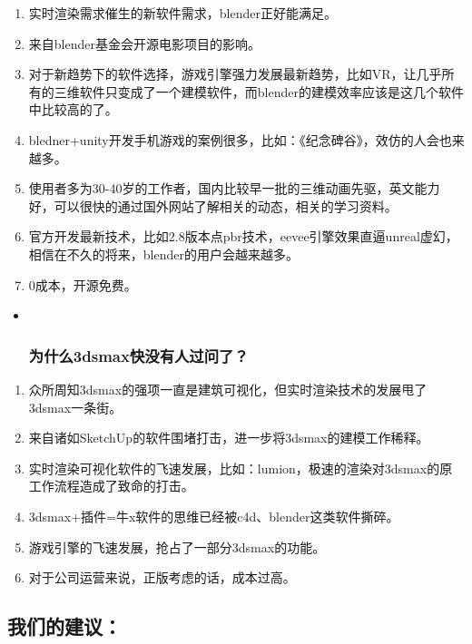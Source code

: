 \documentclass[]{article}
\begin{document}
\begin{enumerate}
\def\labelenumi{\arabic{enumi}.}
\item
  实时渲染需求催生的新软件需求，blender正好能满足。
\item
  来自blender基金会开源电影项目的影响。
\item
  对于新趋势下的软件选择，游戏引擎强力发展最新趋势，比如VR，让几乎所有的三维软件只变成了一个建模软件，而blender的建模效率应该是这几个软件中比较高的了。
\item
  bledner+unity开发手机游戏的案例很多，比如：《纪念碑谷》，效仿的人会也来越多。
\item
  使用者多为30-40岁的工作者，国内比较早一批的三维动画先驱，英文能力好，可以很快的通过国外网站了解相关的动态，相关的学习资料。
\item
  官方开发最新技术，比如2.8版本点pbr技术，eevee引擎效果直逼unreal虚幻，相信在不久的将来，blender的用户会越来越多。
\item
  0成本，开源免费。
\end{enumerate}

\begin{itemize}
\item ~
  \subsubsection{\texorpdfstring{\textbf{为什么3dsmax快没有人过问了？}}{为什么3dsmax快没有人过问了？}}\label{header-n160}
\end{itemize}

\begin{enumerate}
\def\labelenumi{\arabic{enumi}.}
\item
  众所周知3dsmax的强项一直是建筑可视化，但实时渲染技术的发展甩了3dsmax一条街。
\item
  来自诸如SketchUp的软件围堵打击，进一步将3dsmax的建模工作稀释。
\item
  实时渲染可视化软件的飞速发展，比如：lumion，极速的渲染对3dsmax的原工作流程造成了致命的打击。
\item
  3dsmax+插件=牛x软件的思维已经被c4d、blender这类软件撕碎。
\item
  游戏引擎的飞速发展，抢占了一部分3dsmax的功能。
\item
  对于公司运营来说，正版考虑的话，成本过高。
\end{enumerate}

\subsection{\texorpdfstring{\textbf{我们的建议：}}{我们的建议：}}\label{header-n175}
\end{document}
